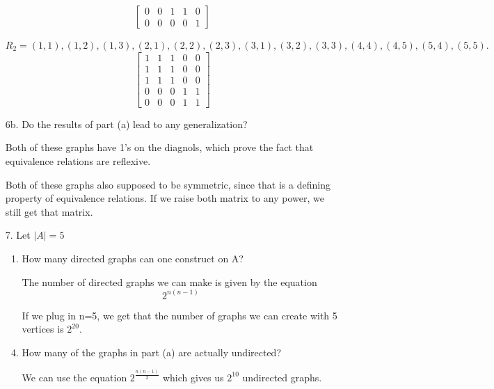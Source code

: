 \documentclass[letterpaper,11pt]{article}
\begin{document}
\begin{enumerate}
\begin{equation}
\begin{bmatrix}
            0 & 0 & 1 & 1 & 0\\
            0 & 0 & 0 & 0 & 1
        \end{bmatrix}
    \end{equation}
    \item[] $R_2 = {(1, 1),(1, 2),(1, 3),(2, 1),(2, 2),(2, 3),(3, 1),(3, 2),(3, 3),(4, 4),(4, 5),(5, 4),(5, 5)}.$
    \begin{equation}
        \begin{bmatrix}
            1 & 1 & 1 & 0 & 0\\
            1 & 1 & 1 & 0 & 0\\
            1 & 1 & 1 & 0 & 0\\
            0 & 0 & 0 & 1 & 1\\
            0 & 0 & 0 & 1 & 1
        \end{bmatrix}
    \end{equation}
    \item[6b.]Do the results of part (a) lead to any generalization?
    \item[] Both of these graphs have 1's on the diagnols, which prove the fact that equivalence relations are reflexive. 
    \item[] Both of these graphs also supposed to be symmetric, since that is a defining property of equivalence relations. If we raise both matrix to any power, we still get that matrix. 
    \item[7.] Let $\left\lvert A \right\rvert  = 5$
    \begin{enumerate}
        \item How many directed graphs can one construct on A? 
        \item [] The number of directed graphs we can make is given by the equation $$2^{n(n-1)}$$
        \item [] If we plug in n=5, we get that the number of graphs we can create with 5 vertices is $2^20$.
        \item How many of the graphs in part (a) are actually undirected?
        \item [] We can use the equation $2^{\frac{n(n-1)}{2}}$ which gives us $2^{10}$ undirected graphs.
    \end{enumerate}
\end{enumerate}
\end{document}
